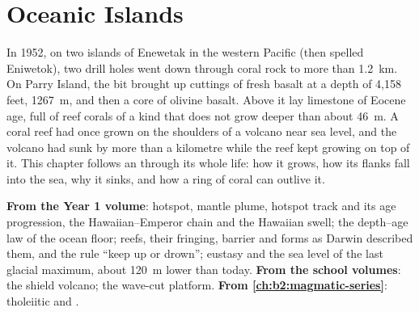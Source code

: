 \chapter{Oceanic Islands}\label{ch:b2:oceanic-islands}

In 1952, on two islands of Enewetak  in the western Pacific (then spelled Eniwetok), two
drill holes went down through coral rock to more than \qty{1.2}{km}. On Parry Island, the bit
brought up cuttings of fresh basalt at a depth of 4,158 feet, \qty{1267}{m}, and then a core of
olivine basalt. Above it lay limestone of Eocene age, full of reef corals of a kind that does not
grow deeper than about \qty{46}{m}. A coral reef had once grown on the shoulders of a volcano near
sea level, and the volcano had sunk by more than a kilometre while the reef kept growing on top of
it. This chapter follows an  through its whole life: how it grows, how its flanks
fall into the sea, why it sinks, and how a ring of coral can outlive it.

\begin{recall}
\textbf{From the Year 1 volume}: hotspot, mantle plume, hotspot track and its age progression,
the Hawaiian--Emperor chain and the Hawaiian swell; the depth--age law of the ocean floor; reefs,
their fringing, barrier and  forms as Darwin described them, and the rule ``keep up or
drown''; eustasy and the sea level of the last glacial maximum, about \qty{120}{m} lower than
today. \textbf{From the school volumes}: the shield volcano; the wave-cut platform.
\textbf{From \cref{ch:b2:magmatic-series}}: tholeiitic and .
\end{recall}

